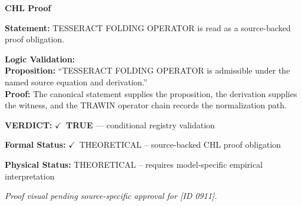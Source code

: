 \vspace{0.45em}
\noindent\textbf{CHL Proof}\par
\textbf{Statement:} TESSERACT FOLDING OPERATOR is read as a source-backed proof obligation.

\textbf{Logic Validation:}\\
\textbf{Proposition:} ``TESSERACT FOLDING OPERATOR is admissible under the named source equation and derivation.''\\
\textbf{Proof:} The canonical statement supplies the proposition, the derivation supplies the witness, and the TRAWIN operator chain records the normalization path.

\textbf{VERDICT:} \ensuremath{\checkmark}\ \textbf{TRUE} --- conditional registry validation

\textbf{Formal Status:} \ensuremath{\checkmark}\ THEORETICAL -- source-backed CHL proof obligation

\textbf{Physical Status:} THEORETICAL -- requires model-specific empirical interpretation
\par\vspace{0.45em}
\par
\vfill
\begingroup\footnotesize\itshape
Proof visual pending source-specific approval for [ID 0911].
\par\endgroup
\vfill
\endgroup
\endgroup

